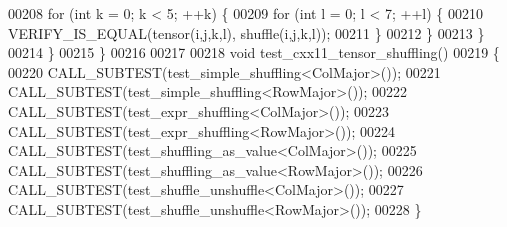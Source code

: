 \begin{DoxyCode}
00208       \textcolor{keywordflow}{for} (\textcolor{keywordtype}{int} k = 0; k < 5; ++k) \{
00209         \textcolor{keywordflow}{for} (\textcolor{keywordtype}{int} l = 0; l < 7; ++l) \{
00210           VERIFY\_IS\_EQUAL(tensor(i,j,k,l), shuffle(i,j,k,l));
00211         \}
00212       \}
00213     \}
00214   \}
00215 \}
00216 
00217 
00218 \textcolor{keywordtype}{void} test\_cxx11\_tensor\_shuffling()
00219 \{
00220   CALL\_SUBTEST(test\_simple\_shuffling<ColMajor>());
00221   CALL\_SUBTEST(test\_simple\_shuffling<RowMajor>());
00222   CALL\_SUBTEST(test\_expr\_shuffling<ColMajor>());
00223   CALL\_SUBTEST(test\_expr\_shuffling<RowMajor>());
00224   CALL\_SUBTEST(test\_shuffling\_as\_value<ColMajor>());
00225   CALL\_SUBTEST(test\_shuffling\_as\_value<RowMajor>());
00226   CALL\_SUBTEST(test\_shuffle\_unshuffle<ColMajor>());
00227   CALL\_SUBTEST(test\_shuffle\_unshuffle<RowMajor>());
00228 \}
\end{DoxyCode}
